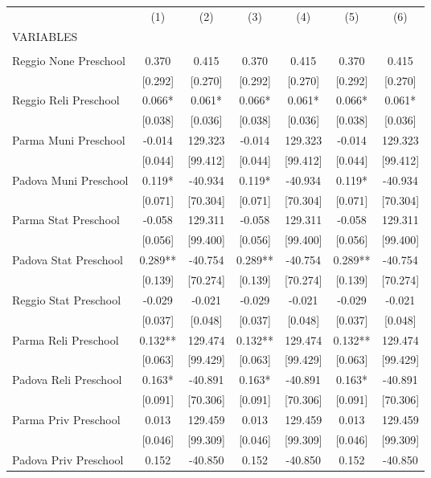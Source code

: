 \begin{tabular}{lcccccc} \hline
 & (1) & (2) & (3) & (4) & (5) & (6) \\
VARIABLES &  &  &  &  &  &  \\ \hline
 &  &  &  &  &  &  \\
Reggio None Preschool & 0.370 & 0.415 & 0.370 & 0.415 & 0.370 & 0.415 \\
 & [0.292] & [0.270] & [0.292] & [0.270] & [0.292] & [0.270] \\
Reggio Reli Preschool & 0.066* & 0.061* & 0.066* & 0.061* & 0.066* & 0.061* \\
 & [0.038] & [0.036] & [0.038] & [0.036] & [0.038] & [0.036] \\
Parma Muni Preschool & -0.014 & 129.323 & -0.014 & 129.323 & -0.014 & 129.323 \\
 & [0.044] & [99.412] & [0.044] & [99.412] & [0.044] & [99.412] \\
Padova Muni Preschool & 0.119* & -40.934 & 0.119* & -40.934 & 0.119* & -40.934 \\
 & [0.071] & [70.304] & [0.071] & [70.304] & [0.071] & [70.304] \\
Parma Stat Preschool & -0.058 & 129.311 & -0.058 & 129.311 & -0.058 & 129.311 \\
 & [0.056] & [99.400] & [0.056] & [99.400] & [0.056] & [99.400] \\
Padova Stat Preschool & 0.289** & -40.754 & 0.289** & -40.754 & 0.289** & -40.754 \\
 & [0.139] & [70.274] & [0.139] & [70.274] & [0.139] & [70.274] \\
Reggio Stat Preschool & -0.029 & -0.021 & -0.029 & -0.021 & -0.029 & -0.021 \\
 & [0.037] & [0.048] & [0.037] & [0.048] & [0.037] & [0.048] \\
Parma Reli Preschool & 0.132** & 129.474 & 0.132** & 129.474 & 0.132** & 129.474 \\
 & [0.063] & [99.429] & [0.063] & [99.429] & [0.063] & [99.429] \\
Padova Reli Preschool & 0.163* & -40.891 & 0.163* & -40.891 & 0.163* & -40.891 \\
 & [0.091] & [70.306] & [0.091] & [70.306] & [0.091] & [70.306] \\
Parma Priv Preschool & 0.013 & 129.459 & 0.013 & 129.459 & 0.013 & 129.459 \\
 & [0.046] & [99.309] & [0.046] & [99.309] & [0.046] & [99.309] \\
Padova Priv Preschool & 0.152 & -40.850 & 0.152 & -40.850 & 0.152 & -40.850 \\

\end{tabular}
